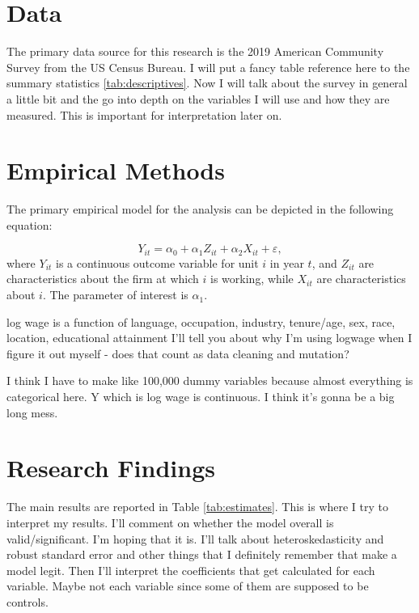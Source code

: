 \documentclass[12pt,english]{article}
\begin{document}
\section{Data}\label{sec:data}

The primary data source for this research is the 2019 American Community Survey from the US Census Bureau. I will put a fancy table reference here to the summary statistics \ref{tab:descriptives}. 
Now I will talk about the survey in general a little bit and the go into depth on the variables I will use and how they are measured. This is important for interpretation later on. 


\section{Empirical Methods}\label{sec:methods}
The primary empirical model for the analysis can be depicted in the following equation:

\begin{equation}
\label{eq:1}
Y_{it}=\alpha_{0} + \alpha_{1}Z_{it} + \alpha_{2} X_{it} + \varepsilon,
\end{equation}
where $Y_{it}$ is a continuous outcome variable for unit $i$ in year $t$, and $Z_{it}$ are characteristics about the firm at which $i$ is working, while $X_{it}$ are characteristics about $i$. The parameter of interest is $\alpha_{1}$.

log wage is a function of language, occupation, industry, tenure/age, sex, race, location, educational attainment
I'll tell you about why I'm using logwage when I figure it out myself - does that count as data cleaning and mutation?

I think I have to make like 100,000 dummy variables because almost everything is categorical here. Y which is log wage is continuous. I think it's gonna be a big long mess.

\section{Research Findings}\label{sec:results}
The main results are reported in Table \ref{tab:estimates}.
This is where I try to interpret my results. I'll comment on whether the model overall is valid/significant. I'm hoping that it is. I'll talk about heteroskedasticity and robust standard error and other things that I definitely remember that make a model legit. Then I'll interpret the coefficients that get calculated for each variable. Maybe not each variable since some of them are supposed to be controls. 
\end{document}
